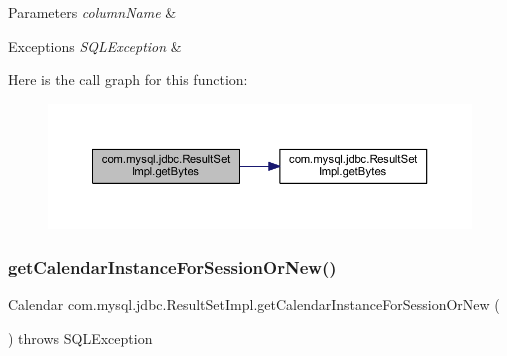 \begin{DoxyParams}{Parameters}
{\em column\+Name} & \\
\hline
\end{DoxyParams}

\begin{DoxyExceptions}{Exceptions}
{\em S\+Q\+L\+Exception} & \\
\hline
\end{DoxyExceptions}
Here is the call graph for this function\+:
\nopagebreak
\begin{figure}[H]
\begin{center}
\leavevmode
\includegraphics[width=350pt]{classcom_1_1mysql_1_1jdbc_1_1_result_set_impl_a0c4ba0624ab9ded2a2decf15d66e855d_cgraph}
\end{center}
\end{figure}
\mbox{\label{classcom_1_1mysql_1_1jdbc_1_1_result_set_impl_a11c9733e6a1c56774441465dbf40ed58}} 
\subsubsection{\texorpdfstring{get\+Calendar\+Instance\+For\+Session\+Or\+New()}{getCalendarInstanceForSessionOrNew()}}
{\footnotesize\ttfamily Calendar com.\+mysql.\+jdbc.\+Result\+Set\+Impl.\+get\+Calendar\+Instance\+For\+Session\+Or\+New (\begin{DoxyParamCaption}{ }\end{DoxyParamCaption}) throws S\+Q\+L\+Exception\hspace{0.3cm}{\ttfamily [protected]}}

